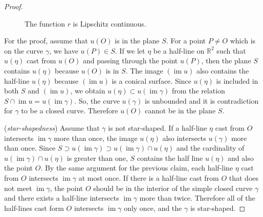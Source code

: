 \documentclass{amsart}
\theoremstyle{plain}
\theoremstyle{definition}
\theoremstyle{remark}
\DeclareMathOperator{\im}{im}
\begin{document}
\begin{proof}
\begin{figure}%
\caption{The function $r$ is Lipschitz continuous.}
\end{figure}


For the proof, 
assume that $u(O)$ is in the plane $S$.
For a point $P\ne O$ which is on the curve $\gamma$, we have $u(P)\in S$.
If we let $\eta$ be a half-line on $\mathbb{R}^2$ such that $u(\eta)$ cast from $u(O)$ and passing through the point $u(P)$, then the plane $S$ contains $u(\eta)$ because $u(O)$ is in $S$.
The image $(\im u)$ also contains the half-line $u(\eta)$ because $(\im u)$ is a conical surface.
Since $u(\eta)$ is included in both $S$ and $(\im u)$, we obtain $u(\eta)\subset u(\im\gamma)$ from the relation $S\cap\im u=u(\im \gamma)$.
So, the curve $u(\gamma)$ is unbounded and it is contradiction for $\gamma$ to be a closed curve.
Therefore $u(O)$ cannot be in the plane $S$.

(\emph{star-shapedness})
Assume that $\gamma$ is not star-shaped.
If a half-line $\eta$ cast from $O$ intersects $\im\gamma$ more than once, the image $u(\eta)$ also intersects $u(\gamma)$ more than once.
Since $S\supset u(\im\gamma)\supset u(\im\gamma)\cap u(\eta)$ and the cardinality of $u(\im\gamma)\cap u(\eta)$ is greater than one, $S$ contains the half line $u(\eta)$ and also the point $O$.
By the same argument for the previous claim, 
each half-line $\eta$ cast from $O$ intersects $\im\gamma$ at most once.
If there is a half-line cast from $O$ that does not meet $\im\gamma$, the point $O$ should be in the interior of the simple closed curve $\gamma$ and there exists a half-line intersects $\im\gamma$ more than twice.
Therefore all of the half-lines cast form $O$ intersects $\im\gamma$ only once, and the $\gamma$ is star-shaped.


\end{proof}
\end{document}
